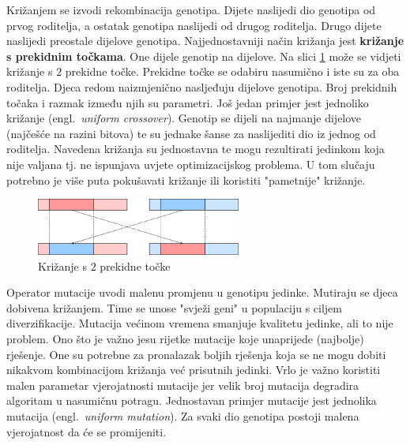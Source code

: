 \documentclass[times, utf8, diplomski]{fer}
\begin{document}
Križanjem se izvodi rekombinacija genotipa. Dijete naslijedi dio genotipa od prvog roditelja, a ostatak genotipa naslijedi od drugog roditelja. Drugo dijete naslijedi preostale dijelove genotipa. Najjednostavniji način križanja jest \textbf{križanje s prekidnim točkama}. One dijele genotip na dijelove. Na slici \ref{fig:crossover} može se vidjeti križanje s $2$ prekidne točke. Prekidne točke se odabiru nasumično i iste su za oba roditelja. Djeca redom naizmjenično nasljeđuju dijelove genotipa. Broj prekidnih točaka i razmak između njih su parametri. Još jedan primjer jest jednoliko križanje (engl.~\textit{uniform crossover}). Genotip se dijeli na najmanje dijelove (najčešće na razini bitova) te su jednake šanse za naslijediti dio iz jednog od roditelja. Navedena križanja su jednostavna te mogu rezultirati jedinkom koja nije valjana tj. ne ispunjava uvjete optimizacijskog problema. U tom slučaju potrebno je više puta pokušavati križanje ili koristiti "pametnije" križanje.

\begin{figure}[htb]
	\centering
	\includegraphics[width=0.6\textwidth]{img/crossover.png}
	\caption{Križanje s $2$ prekidne točke}
	\label{fig:crossover}
\end{figure}

Operator mutacije uvodi malenu promjenu u genotipu jedinke. Mutiraju se djeca dobivena križanjem. Time se unose "svježi geni" u populaciju s ciljem diverzifikacije. Mutacija većinom vremena smanjuje kvalitetu jedinke, ali to nije problem. Ono što je važno jesu rijetke mutacije koje unaprijede (najbolje) rješenje. One su potrebne za pronalazak boljih rješenja koja se ne mogu dobiti nikakvom kombinacijom križanja već prisutnih jedinki. Vrlo je važno koristiti malen parametar vjerojatnosti mutacije jer velik broj mutacija degradira algoritam u nasumičnu potragu. Jednostavan primjer mutacije jest jednolika mutacija (engl.~\textit{uniform mutation}). Za svaki dio genotipa postoji malena vjerojatnost da će se promijeniti.
\end{document}
